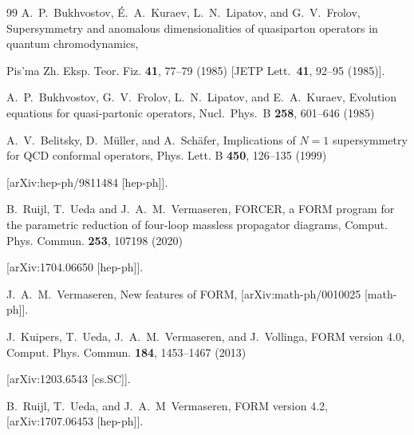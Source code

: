\documentclass[
 twocolumn,
 superscriptaddress,
 preprintnumbers,
 nofootinbib,
 amsmath,amssymb,
 aps,
 prl
 ]{revtex4-2}
\begin{document}
\begin{thebibliography}{99}
A.~P.~Bukhvostov, \'E.~A.~Kuraev, L.~N.~Lipatov, and G.~V.~Frolov,
Supersymmetry and anomalous dimensionalities of quasiparton operators in quantum chromodynamics,

Pis'ma Zh. Eksp. Teor. Fiz. \textbf{41}, 77--79  (1985)
[JETP Lett.\ \textbf{41}, 92--95 (1985)].



A.~P.~Bukhvostov, G.~V.~Frolov, L.~N.~Lipatov, and E.~A.~Kuraev,
Evolution equations for quasi-partonic operators,
Nucl.\ Phys.\ B \textbf{258}, 601--646 (1985)



A.~V.~Belitsky, D.~M\"uller, and A.~Sch\"afer,
Implications of $N=1$ supersymmetry for QCD conformal operators,
Phys. Lett. B \textbf{450}, 126--135 (1999)

[arXiv:hep-ph/9811484 [hep-ph]].



















B.~Ruijl, T.~Ueda and J.~A.~M.~Vermaseren,
FORCER, a FORM program for the parametric reduction of four-loop massless propagator diagrams,
Comput. Phys. Commun. \textbf{253}, 107198 (2020)

[arXiv:1704.06650 [hep-ph]].



J.~A.~M.~Vermaseren,
New features of FORM,
[arXiv:math-ph/0010025 [math-ph]].



J.~Kuipers, T.~Ueda, J.~A.~M.~Vermaseren, and J.~Vollinga,
FORM version 4.0,
Comput. Phys. Commun. \textbf{184}, 1453--1467 (2013)

[arXiv:1203.6543 [cs.SC]].



B.~Ruijl, T.~Ueda, and J.~A.~M~Vermaseren,
FORM version 4.2,
[arXiv:1707.06453 [hep-ph]].


\end{thebibliography}\endgroup



\newpage
\cleardoublepage
\appendix
\end{document}
